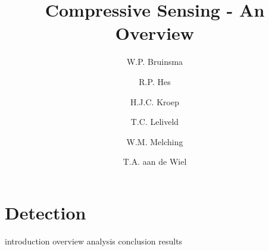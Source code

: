 \documentclass[a4paper, openany, oneside]{memoir}
\title{Compressive Sensing - An Overview}
\author{W.P. Bruinsma \and R.P. Hes \and H.J.C. Kroep \and T.C. Leliveld \and W.M. Melching \and T.A. aan de Wiel}
\begin{document}
\chapter{Detection}
\label{cha:detection}
{introduction}
{overview}
{analysis}
{conclusion}
{results}
\end{document}
